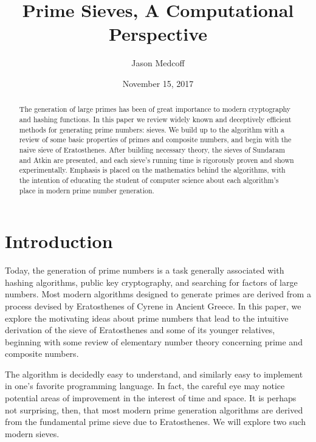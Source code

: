 \documentclass{amsart}
\title{Prime Sieves, A Computational Perspective}
\author{Jason Medcoff}
\date{November 15, 2017}
\theoremstyle{definition}
\theoremstyle{case}
\begin{document}
    \maketitle
    
    \begin{abstract}
    	The generation of large primes has been of great importance to modern cryptography and hashing functions. In this paper we review widely known and deceptively efficient methods for generating prime numbers: sieves. We build up to the algorithm with a review of some basic properties of primes and composite numbers, and begin with the naive sieve of Eratosthenes. After building necessary theory, the sieves of Sundaram and Atkin are presented, and each sieve's running time is rigorously proven and shown experimentally.
    	Emphasis is placed on the mathematics behind the algorithms, with the intention of educating the student of computer science about each algorithm's place in modern prime number generation.
    \end{abstract}
    
    
    
    \section*{Introduction}
    
    Today, the generation of prime numbers is a task generally associated with hashing algorithms, public key cryptography, and searching for factors of large numbers. Most modern algorithms designed to generate primes are derived from a process devised by Eratosthenes of Cyrene in Ancient Greece. In this paper, we explore the motivating ideas about prime numbers that lead to the intuitive derivation of the sieve of Eratosthenes and some of its younger relatives, beginning with some review of elementary number theory concerning prime and composite numbers.
        
    The algorithm is decidedly easy to understand, and similarly easy to implement in one's favorite programming language. In fact, the careful eye may notice potential areas of improvement in the interest of time and space. It is perhaps not surprising, then, that most modern prime generation algorithms are derived from the fundamental prime sieve due to Eratosthenes. We will explore two such modern sieves.
    
\end{document}
